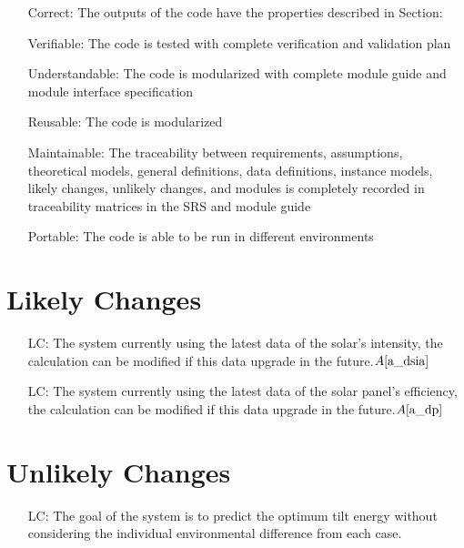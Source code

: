\documentclass[12pt]{article}
\newcommand{\aref}[1]{A\ref{#1}}
\newcounter{lcnum} %
\begin{document}
\noindent\begin{itemize}
\item[ ]Correct: The outputs of the code have the properties described in Section: 
\item[ ]Verifiable: The code is tested with complete verification and validation plan
\item[ ]Understandable: The code is modularized with complete module guide and module interface specification
\item[ ]Reusable: The code is modularized
\item[ ]Maintainable: The traceability between requirements, assumptions, theoretical models, general definitions, data definitions, instance models, likely changes, unlikely changes, and modules
is completely recorded in traceability matrices in the SRS and module guide
\item[ ]Portable: The code is able to be run in different environments
\end{itemize}

\section{Likely Changes}    

\noindent \begin{itemize}

\item[LC\refstepcounter{lcnum}\thelcnum\label{LC_SI}:] The system currently using the latest data of the solar's intensity, the calculation can be modified if this data upgrade in the future.$\aref{a_dsia}$

\item[LC\refstepcounter{lcnum}\thelcnum\label{LC_P}:] The system currently using the latest data of the solar panel's efficiency, the calculation can be modified if this data upgrade in the future.$\aref{a_dp}$

\end{itemize}

\section{Unlikely Changes}    

\noindent \begin{itemize}

\item[LC\refstepcounter{lcnum}\thelcnum\label{LC_G}:] The goal of the system is to predict the optimum tilt energy without considering the individual environmental difference from each case.

\end{itemize}
\end{document}
